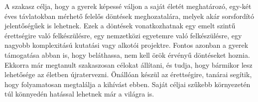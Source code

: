 A szakasz célja, hogy a gyerek képessé váljon a saját életét
meghatározó, egy-két éves távlatokban mérhető felelős döntések
meghozatalára, melyek akár sorsfordító jelentőségűek is lehetnek. Ezek a
döntések vonatkozhatnak egy emelt szintű érettségire való felkészülésre,
egy nemzetközi egyetemre való felkészülésre, egy nagyobb komplexitású
kutatási vagy alkotói projektre. Fontos azonban a gyerek támogatása
abban is, hogy beláthassa, nem kell örök érvényű döntéseket hoznia.
Ekkorra már megtanult szakaszosan célokat állítani, és tudja, hogy
bármikor lesz lehetősége az életben újratervezni. Önállóan készül az
érettségire, tanárai segítik, hogy folyamatosan megtalálja a kihívást
ebben. Saját céljai szűkebb környezetén túl könnyedén hatással lehetnek
már a világra is.
